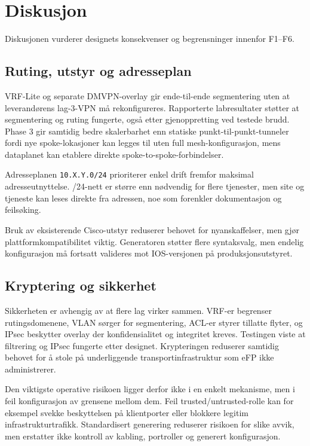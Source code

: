 \section{Diskusjon}

Diskusjonen vurderer designets konsekvenser og begrensninger innenfor F1--F6. 

\subsection{Ruting, utstyr og adresseplan}

VRF-Lite og separate DMVPN-overlay gir ende-til-ende segmentering uten at leverandørens lag-3-VPN må rekonfigureres. Rapporterte labresultater støtter at segmentering og ruting fungerte, også etter gjenoppretting ved testede brudd. Phase 3 gir samtidig bedre skalerbarhet enn statiske punkt-til-punkt-tunneler fordi nye spoke-lokasjoner kan legges til uten full mesh-konfigurasjon, mens dataplanet kan etablere direkte spoke-to-spoke-forbindelser.

Adresseplanen \texttt{10.X.Y.0/24} prioriterer enkel drift fremfor maksimal adresseutnyttelse. /24-nett er større enn nødvendig for flere tjenester, men site og tjeneste kan leses direkte fra adressen, noe som forenkler dokumentasjon og feilsøking.

Bruk av eksisterende Cisco-utstyr reduserer behovet for nyanskaffelser, men gjør plattformkompatibilitet viktig. Generatoren støtter flere syntaksvalg, men endelig konfigurasjon må fortsatt valideres mot IOS-versjonen på produksjonsutstyret.

\subsection{Kryptering og sikkerhet}
    
Sikkerheten er avhengig av at flere lag virker sammen. VRF-er begrenser rutingsdomenene, VLAN sørger for segmentering, ACL-er styrer tillatte flyter, og IPsec beskytter overlay der konfidensialitet og integritet kreves. Testingen viste at filtrering og IPsec fungerte etter designet. Krypteringen reduserer samtidig behovet for å stole på underliggende transportinfrastruktur som eFP ikke administrerer.

Den viktigste operative risikoen ligger derfor ikke i en enkelt mekanisme, men i feil konfigurasjon av grensene mellom dem. Feil trusted/untrusted-rolle kan for eksempel svekke beskyttelsen på klientporter eller blokkere legitim infrastrukturtrafikk. Standardisert generering reduserer risikoen for slike avvik, men erstatter ikke kontroll av kabling, portroller og generert konfigurasjon.

